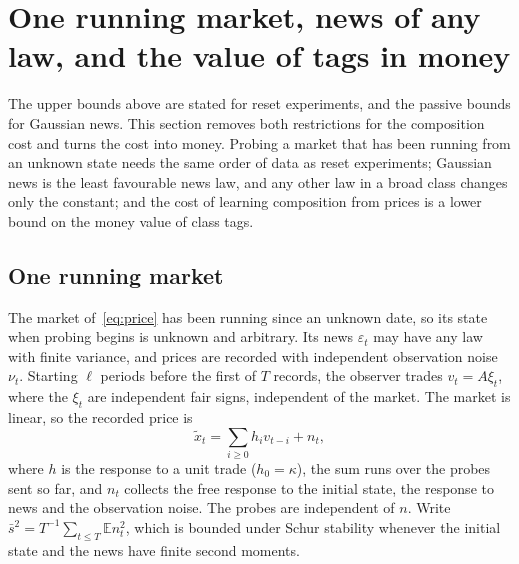 \documentclass[12pt]{article}
\theoremstyle{definition}
\theoremstyle{remark}
\begin{document}
\section{One running market, news of any law, and the value of tags in money}\label{app:runningnews}

The upper bounds above are stated for reset experiments, and the passive bounds for Gaussian news. This section removes both restrictions for the composition cost and turns the cost into money. Probing a market that has been running from an unknown state needs the same order of data as reset experiments; Gaussian news is the least favourable news law, and any other law in a broad class changes only the constant; and the cost of learning composition from prices is a lower bound on the money value of class tags.

\subsection{One running market}

The market of~\eqref{eq:price} has been running since an unknown date, so its state when probing begins is unknown and arbitrary. Its news $\varepsilon_t$ may have any law with finite variance, and prices are recorded with independent observation noise $\nu_t$. Starting $\ell$ periods before the first of $T$ records, the observer trades $v_t=A\xi_t$, where the $\xi_t$ are independent fair signs, independent of the market. The market is linear, so the recorded price is
\[
\tilde x_t=\sum_{i\ge0}h_iv_{t-i}+n_t ,
\]
where $h$ is the response to a unit trade ($h_0=\kappa$), the sum runs over the probes sent so far, and $n_t$ collects the free response to the initial state, the response to news and the observation noise. The probes are independent of $n$. Write $\bar s^2=T^{-1}\sum_{t\le T}\mathbb E n_t^2$, which is bounded under Schur stability whenever the initial state and the news have finite second moments.
\end{document}
